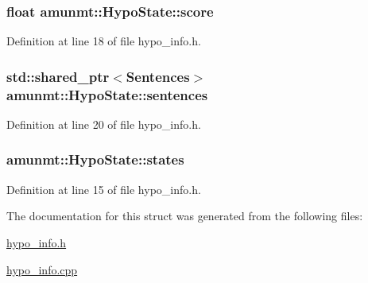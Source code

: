 \subsubsection[{\texorpdfstring{score}{score}}]{\setlength{\rightskip}{0pt plus 5cm}float amunmt\+::\+Hypo\+State\+::score}\hypertarget{structamunmt_1_1HypoState_a2ae5a8d48d818badc61ed4b2e367ed8a}{}\label{structamunmt_1_1HypoState_a2ae5a8d48d818badc61ed4b2e367ed8a}


Definition at line 18 of file hypo\+\_\+info.\+h.

\subsubsection[{\texorpdfstring{sentences}{sentences}}]{\setlength{\rightskip}{0pt plus 5cm}std\+::shared\+\_\+ptr$<${\bf Sentences}$>$ amunmt\+::\+Hypo\+State\+::sentences}\hypertarget{structamunmt_1_1HypoState_aef7182ec23fafad9872aecde19805822}{}\label{structamunmt_1_1HypoState_aef7182ec23fafad9872aecde19805822}


Definition at line 20 of file hypo\+\_\+info.\+h.

\subsubsection[{\texorpdfstring{states}{states}}]{ amunmt\+::\+Hypo\+State\+::states}\hypertarget{structamunmt_1_1HypoState_aaf08886f1ee6a0723bb9e9cad5737a9d}{}\label{structamunmt_1_1HypoState_aaf08886f1ee6a0723bb9e9cad5737a9d}


Definition at line 15 of file hypo\+\_\+info.\+h.



The documentation for this struct was generated from the following files\+:\begin{DoxyCompactItemize}
\item 
\hyperlink{hypo__info_8h}{hypo\+\_\+info.\+h}\item 
\hyperlink{hypo__info_8cpp}{hypo\+\_\+info.\+cpp}\end{DoxyCompactItemize}
